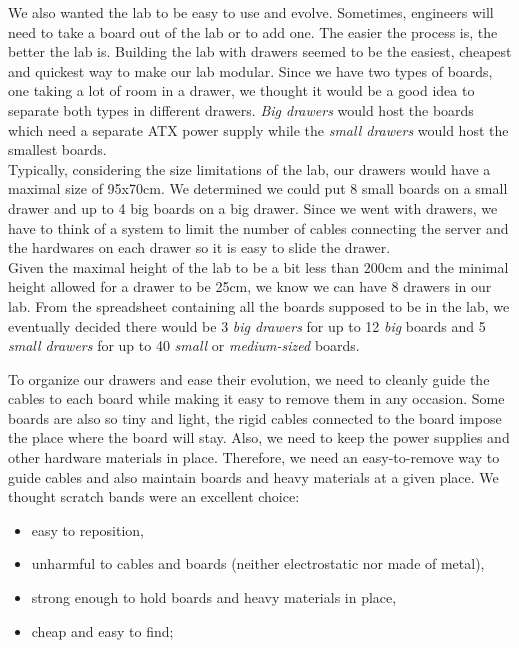 We also wanted the lab to be easy to use and evolve. Sometimes, engineers will need to take a board out of the lab or to add one. The easier the process is, the better the lab is. Building the lab with drawers seemed to be the easiest, cheapest and quickest way to make our lab modular. Since we have two types of boards, one taking a lot of room in a drawer, we thought it would be a good idea to separate both types in different drawers. \textit{Big drawers} would host the boards which need a separate ATX power supply while the \textit{small drawers} would host the smallest boards.\\
Typically, considering the size limitations of the lab, our drawers would have a maximal size of 95x70cm. We determined we could put 8 small boards on a small drawer and up to 4 big boards on a big drawer. Since we went with drawers, we have to think of a system to limit the number of cables connecting the server and the hardwares on each drawer so it is easy to slide the drawer.\\
Given the maximal height of the lab to be a bit less than 200cm and the minimal height allowed for a drawer to be 25cm, we know we can have 8 drawers in our lab. From the spreadsheet containing all the boards supposed to be in the lab, we eventually decided there would be 3 \textit{big drawers} for up to 12 \textit{big} boards and 5 \textit{small drawers} for up to 40 \textit{small} or \textit{medium-sized} boards.

To organize our drawers and ease their evolution, we need to cleanly guide the cables to each board while making it easy to remove them in any occasion. Some boards are also so tiny and light, the rigid cables connected to the board impose the place where the board will stay. Also, we need to keep the power supplies and other hardware materials in place. Therefore, we need an easy-to-remove way to guide cables and also maintain boards and heavy materials at a given place. We thought scratch bands were an excellent choice:

\begin{itemize}
  \item easy to reposition,
  \item unharmful to cables and boards (neither electrostatic nor made of metal),
  \item strong enough to hold boards and heavy materials in place,
  \item cheap and easy to find;
\end{itemize}

